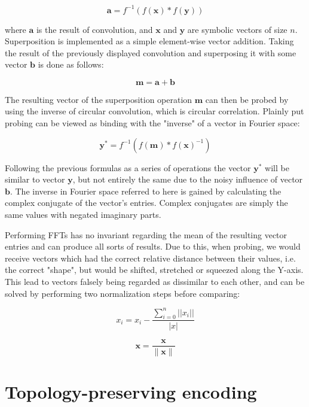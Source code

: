 \documentclass[conference]{IEEEtran}
\begin{document}
	\begin{equation}
	\pmb a = f^{-1}(f(\pmb x) * f(\pmb y))
	\end{equation}
	
	where $\pmb a$ is the result of convolution, and $\pmb x$ and $\pmb y$ are symbolic vectors of size $n$.
Superposition is implemented as a simple element-wise vector addition. Taking the result of the previously displayed convolution and superposing it with some vector $\pmb b$ is done as follows:

	\begin{equation}
	\pmb m = \pmb a + \pmb b
	\end{equation}

The resulting vector of the superposition operation $\pmb m$ can then be probed by using the inverse of circular convolution, which is circular correlation. Plainly put probing can be viewed as binding with the "inverse" of a vector in Fourier space:
	
	\begin{equation}
	\pmb y^* = f^{-1}(f(\pmb m) * f(\pmb x)^{-1})
	\end{equation} 

Following the previous formulas as a series of operations the vector $\pmb y^*$ will be similar to vector $\pmb y$, but not entirely the same due to the noisy influence of vector $\pmb b$. The inverse in Fourier space referred to here is gained by calculating the complex conjugate of the vector's entries. Complex conjugates are simply the same values with negated imaginary parts.
		
	Performing FFTs has no invariant regarding the mean of the resulting vector entries and can produce all sorts of results.
Due to this, when probing, we would receive vectors which had the correct relative distance between their values, i.e.
the correct "shape", but would be shifted, stretched or squeezed along the Y-axis. This lead to vectors falsely being regarded as dissimilar to each other, and can be solved by performing two normalization steps before comparing:

	\begin{equation}
	x_i = x_i - \frac{\sum_{i=0}^n ||x_i||}{|x|}
	\end{equation} 	
	
	\begin{equation}
	\pmb x = \frac{\pmb x }{ \| \pmb x \|}
	\end{equation} 	
	
	\section{Topology-preserving encoding}
	
\end{document}
